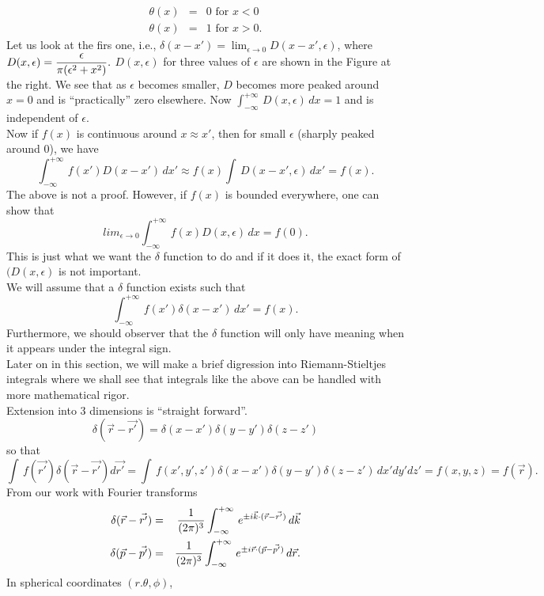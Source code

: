 \begin{eqnarray*}
\theta(x) &=& 0 \mbox{ for } x<0\\
\theta(x) &=& 1 \mbox{ for } x > 0.
\end{eqnarray*}
Let us look at the firs one, i.e., 
$\delta(x-x') = \lim_{\epsilon\rightarrow 0} D(x-x',\epsilon)$, where $\displaystyle D(x,\epsilon) = {\epsilon\over \pi (\epsilon^2 + x^2)}.$
$D(x,\epsilon)$ for three values of $\epsilon$ are shown in the Figure at the right. We see that as $\epsilon$ becomes smaller, $D$ becomes more peaked around $x=0$ and is 
``practically'' zero elsewhere. Now $\displaystyle \int_{-\infty}^{+\infty} \, D(x,\epsilon)\, dx = 1$ and is independent of $\epsilon$. \\
Now if $f(x)$ is continuous around $x\approx x'$, then for small $ \epsilon$ (sharply peaked around 0), we have
$$ \int_{-\infty}^{+\infty}\, f(x') D(x-x')\,dx' \approx f(x) \int\, D(x-x',\epsilon)\, dx' = f(x).$$
The above is not a proof. However, if $f(x)$ is bounded everywhere, one can show that $$lim_{\epsilon\rightarrow 0}\int_{-\infty}^{+\infty}\, f(x) D(x,\epsilon)\, dx = f(0).$$
This is just what we want the $\delta$ function to do and if it does it, the exact form of $(D(x,\epsilon)$ is not important.\\
We will assume that a $\delta$ function exists such that 
$$\int_{-\infty}^{+\infty}\, f(x') \delta(x-x')\, dx' = f(x).$$
Furthermore, we should observer that the $\delta$ function will only have meaning when it appears under the integral sign.\\
Later on in this section, we will make a brief digression into Riemann-Stieltjes integrals where we shall see that integrals like the above can be handled with 
more mathematical rigor. \\
Extension into 3 dimensions is ``straight forward''. 
$$\delta(\vec{r} - \vec{r'}) = \delta(x-x')\delta(y-y')\delta(z-z')$$ so that 
$$\int\, f(\vec{r'}) \delta(\vec{r} - \vec{r'}) d\vec{r'} = \int\, f(x',y',z') \delta(x-x')\delta(y-y')\delta(z-z')\, dx'dy'dz' = f(x,y,z) = f(\vec{r}).$$
From our work with Fourier transforms
\begin{eqnarray*}
\delta(\vec{r}-\vec{r'}) &=& {1\over (2\pi)^3}   \int_{-\infty}^{+\infty}\, e^{\pm i \vec{k}\cdot(\vec{r}-\vec{r'}) }\, d\vec{k}\\
\delta(\vec{p}-\vec{p'}) &=& {1\over (2\pi)^3} \int_{-\infty}^{+\infty}\, e^{\pm i \vec{r}\cdot(\vec{p}-\vec{p'}) }\, d\vec{r}.
\end{eqnarray*}
In spherical coordinates $(r.\theta, \phi)$,
